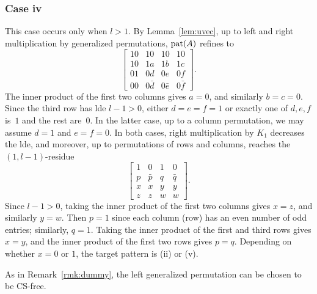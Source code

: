 \documentclass[reprint,amsmath,amssymb,aps,pra]{revtex4-2}
\begin{document}
\subsubsection{Case iv}
\label{sec:caseiv}
This case occurs only when $l>1$. By Lemma~\ref{lem:uvec}, up to left
and right multiplication by generalized permutations, $\operatorname{pat}(A)$
refines to
\[
  \begin{bmatrix}
    10 & 10       & 10       & 10       \\
    10 & 1a       & 1b       & 1c       \\
    01 & 0d       & 0e       & 0f       \\
    00 & 0\bar{d} & 0\bar{e} & 0\bar{f}
  \end{bmatrix}.
\]
The inner product of the first two columns gives $a = 0$, and
similarly $b=c=0$. Since the third row has lde $l-1>0$, either
$d=e=f=1$ or exactly one of $d,e,f$ is~$1$ and the rest are~$0$. In
the latter case, up to a column permutation, we may assume $d=1$ and
$e=f=0$. In both cases, right multiplication by $K_1$ decreases the
lde, and moreover, up to permutations of rows and columns, reaches the
$(1, l-1)$-residue
\[
  \begin{bmatrix}
    1 & 0       & 1 & 0       \\
    p & \bar{p} & q & \bar{q} \\
    x & x       & y & y       \\
    z & z       & w & w
  \end{bmatrix}.
\]
Since $l-1>0$, taking the inner product of the first two columns gives
$x = z$, and similarly $y=w$. Then $p=1$ since each column (row) has
an even number of odd entries; similarly, $q=1$. Taking the inner
product of the first and third rows gives $x = y$, and the inner
product of the first two rows gives $p = q$. Depending on whether
$x=0$ or $1$, the target pattern is (ii) or (v).

\begin{remark}
  As in Remark~\ref{rmk:dummy}, the left generalized permutation can
  be chosen to be CS-free.
\end{remark}
\end{document}
